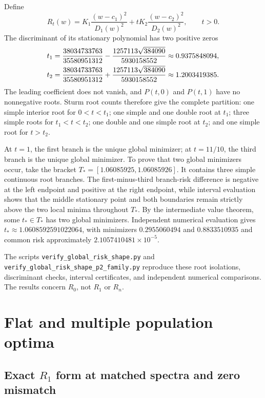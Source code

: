 Define
\begin{equation}
 R_t(w)=K_1\frac{(w-c_1)^2}{D_1(w)^2}+tK_2\frac{(w-c_2)^2}{D_2(w)^2},\qquad t>0.
\end{equation}
The discriminant of its stationary polynomial has two positive zeros
\begin{align}
 t_1&=\frac{38034733763}{35580951312}-\frac{1257113\sqrt{384090}}{5930158552}\approx0.9375848094,\notag\\
 t_2&=\frac{38034733763}{35580951312}+\frac{1257113\sqrt{384090}}{5930158552}\approx1.2003419385.
\end{align}
The leading coefficient does not vanish, and $P(t,0)$ and $P(t,1)$ have no nonnegative roots. Sturm root counts therefore give the complete partition: one simple interior root for $0<t<t_1$; one simple and one double root at $t_1$; three simple roots for $t_1<t<t_2$; one double and one simple root at $t_2$; and one simple root for $t>t_2$.

At $t=1$, the first branch is the unique global minimizer; at $t=11/10$, the third branch is the unique global minimizer. To prove that two global minimizers occur, take the bracket $T_*=[1.06085925,1.06085926]$. It contains three simple continuous root branches. The first-minus-third branch-risk difference is negative at the left endpoint and positive at the right endpoint, while interval evaluation shows that the middle stationary point and both boundaries remain strictly above the two local minima throughout $T_*$. By the intermediate value theorem, some $t_*\in T_*$ has two global minimizers. Independent numerical evaluation gives $t_*\approx1.0608592591022064$, with minimizers $0.2955060494$ and $0.8833510935$ and common risk approximately $2.1057410481\times10^{-5}$.

The scripts \texttt{verify\_global\_risk\_shape.py} and \texttt{verify\_global\_risk\_shape\_p2\_family.py} reproduce these root isolations, discriminant checks, interval certificates, and independent numerical comparisons. The results concern $R_0$, not $R_1$ or $R_n$.

\section{Flat and multiple population optima}
\label{supp:degenerate}

\subsection{Exact $R_1$ form at matched spectra and zero mismatch}

